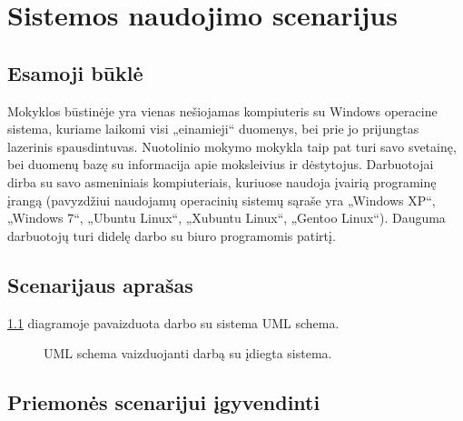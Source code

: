 \chapter{Sistemos naudojimo scenarijus}

\section{Esamoji būklė}

Mokyklos būstinėje yra vienas nešiojamas kompiuteris su Windows operacine
sistema, kuriame laikomi visi „einamieji“ duomenys, bei prie jo prijungtas 
lazerinis spausdintuvas. Nuotolinio mokymo mokykla taip pat turi savo 
svetainę, bei duomenų bazę su informacija apie moksleivius ir dėstytojus.
Darbuotojai dirba su savo asmeniniais kompiuteriais, kuriuose naudoja
įvairią programinę įrangą (pavyzdžiui naudojamų operacinių sistemų 
sąraše yra „Windows XP“, „Windows 7“, „Ubuntu Linux“, „Xubuntu Linux“,
„Gentoo Linux“). Dauguma darbuotojų turi didelę darbo su biuro 
programomis patirtį.

\section{Scenarijaus aprašas}

\ref{fig:uml_usecase} diagramoje pavaizduota darbo su sistema UML schema.

\begin{figure}[htb]
  \begin{center}
  \end{center}
  \caption{UML schema vaizduojanti darbą su įdiegta sistema.}
  \label{fig:uml_usecase}
\end{figure}

\section{Priemonės scenarijui įgyvendinti}
